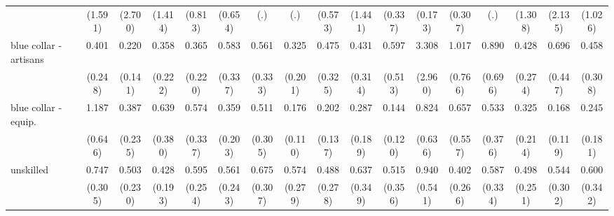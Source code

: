 {\begin{tabular}{l*{16}{c}}
                    &     (1.591)         &     (2.700)         &     (1.414)         &     (0.813)         &     (0.654)         &         (.)         &         (.)         &     (0.573)         &     (1.441)         &     (0.337)         &     (0.173)         &     (0.307)         &         (.)         &     (1.308)         &     (2.135)         &     (1.026)         \\
[1em]
blue collar - artisans&       0.401         &       0.220\sym{*}  &       0.358         &       0.365         &       0.583         &       0.561         &       0.325         &       0.475         &       0.431         &       0.597         &       3.308         &       1.017         &       0.890         &       0.428         &       0.696         &       0.458         \\
                    &     (0.248)         &     (0.141)         &     (0.222)         &     (0.220)         &     (0.337)         &     (0.333)         &     (0.201)         &     (0.325)         &     (0.314)         &     (0.513)         &     (2.960)         &     (0.766)         &     (0.696)         &     (0.274)         &     (0.447)         &     (0.308)         \\
[1em]
blue collar - equip.&       1.187         &       0.387         &       0.639         &       0.574         &       0.359         &       0.511         &       0.176\sym{**} &       0.202\sym{*}  &       0.287         &       0.144\sym{*}  &       0.824         &       0.657         &       0.533         &       0.325         &       0.168\sym{*}  &       0.245         \\
                    &     (0.646)         &     (0.235)         &     (0.380)         &     (0.337)         &     (0.203)         &     (0.305)         &     (0.110)         &     (0.137)         &     (0.189)         &     (0.120)         &     (0.636)         &     (0.557)         &     (0.376)         &     (0.214)         &     (0.119)         &     (0.181)         \\
[1em]
unskilled           &       0.747         &       0.503         &       0.428         &       0.595         &       0.561         &       0.675         &       0.574         &       0.488         &       0.637         &       0.515         &       0.940         &       0.402         &       0.587         &       0.498         &       0.544         &       0.600         \\
                    &     (0.305)         &     (0.230)         &     (0.193)         &     (0.254)         &     (0.243)         &     (0.307)         &     (0.279)         &     (0.278)         &     (0.349)         &     (0.356)         &     (0.541)         &     (0.266)         &     (0.334)         &     (0.251)         &     (0.302)         &     (0.342)         \\

\end{tabular}}
